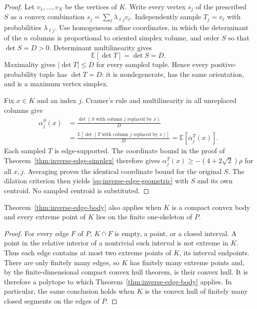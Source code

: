 \begin{proof}
Let $v_1,\ldots,v_N$ be the vertices of $K$.  Write every vertex
$s_j$ of the prescribed $S$ as a convex combination
$s_j=\sum_\ell\lambda_{\ell j}v_\ell$.  Independently sample
$T_j=v_\ell$ with probabilities $\lambda_{\ell j}$.  Use homogeneous
affine coordinates, in which the determinant of the $n$ columns
is proportional to oriented simplex volume, and order $S$ so that
$\det S=D>0$.  Determinant multilinearity gives
\[
 \mathbb E[\det T]=\det S=D.
\]
Maximality gives $|\det T|\leq D$ for every sampled tuple.  Hence
every positive-probability tuple has $\det T=D$: it is
nondegenerate, has the same orientation, and is a maximum vertex
simplex.

Fix $x\in K$ and an index $j$.  Cramer's rule and multilinearity
in all unreplaced columns give
\begin{align}
 \alpha_j^S(x)
 &=\frac{\det(S\text{ with column }j\text{ replaced by }x)}D
 \nonumber\\
 &=\frac{\mathbb E[\det(T\text{ with column }j
                              \text{ replaced by }x)]}D
  =\mathbb E[\alpha_j^T(x)].
 \label{eq:inverse-maximum-averaging}
\end{align}
Each sampled $T$ is edge-supported.  The coordinate bound in the
proof of Theorem~\ref{thm:inverse-edge-simplex} therefore gives
$\alpha_j^T(x)\geq-(4+2\sqrt2)\rho$ for all $x,j$.
Averaging proves the identical coordinate bound for the original
$S$.  The dilation criterion then yields
\eqref{eq:inverse-edge-geometric} with $S$ and its own centroid.
No sampled centroid is substituted.
\end{proof}

\begin{corollary}
\label{cor:inverse-extreme-skeleton}
Theorem~\ref{thm:inverse-edge-body} also applies when $K$ is a compact
convex body and every extreme point of $K$ lies on the finite
one-skeleton of $P$.
\end{corollary}

\begin{proof}
For every edge $F$ of $P$, $K\cap F$ is empty, a point, or a closed
interval.  A point in the relative interior of a nontrivial such
interval is not extreme in $K$.  Thus each edge contains at most
two extreme points of $K$, its interval endpoints.  There are only
finitely many edges, so $K$ has finitely many extreme points and,
by the finite-dimensional compact convex hull theorem, is their
convex hull.  It is therefore a polytope to which
Theorem~\ref{thm:inverse-edge-body} applies.  In particular, the same
conclusion holds when $K$ is the convex hull of finitely many closed
segments on the edges of $P$.
\end{proof}

